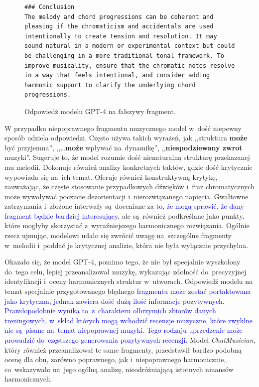 \documentclass[data-science]{agh-wi} %
\begin{document}
\begin{figure}[ht!]
\begin{verbatim}
### Conclusion
The melody and chord progressions can be coherent and pleasing if the chromaticism and accidentals are used intentionally to create tension and resolution. It may sound natural in a modern or experimental context but could be challenging in a more traditional tonal framework. To improve musicality, ensure that the chromatic notes resolve in a way that feels intentional, and consider adding harmonic support to clarify the underlying chord progressions.
\end{verbatim}
    \caption{Odpowiedź modelu GPT-4 na fałszywy fragment.}\label{code:gpt4bad}
\end{figure}

W przypadku niepoprawnego fragmentu muzycznego model w~dość niepewny sposób udziela odpowiedzi. Często używa takich wyrażeń, jak ,,struktura \textbf{może} być przyjemna'', ,,\dots \textbf{może} wpływać na~dynamikę'', ,,\textbf{niespodziewany zwrot} muzyki''. Sugeruje to, że model rozumie dość nienaturalną strukturę przekazanej mu melodii. Dokonuje również analizy konkretnych taktów, gdzie dość krytycznie wypowiada się na~ich temat. Oferuje również konstruktywną krytykę, zauważając, że częste stosowanie przypadkowych dźwięków i~fraz chromatycznych może wywoływać poczucie dezorientacji i~nierozwiązanego napięcia. Gwałtowne zatrzymania i~złożone interwały są~doceniane za \textcolor{blue}{to, że mogą sprawić, że dany fragment będzie bardziej interesujący}, ale są~również podkreślane jako punkty, które mogłyby skorzystać z~wyraźniejszego harmonicznego rozwiązania. Ogólnie rzecz ujmując, modelowi udało się zwrócić uwagę na~szczególne fragmenty w~melodii i~poddać je krytycznej analizie, która nie była wyłącznie przychylna.

Okazało się, że model GPT-4, pomimo tego, że nie był specjalnie wyszkolony do~tego celu, lepiej przeanalizował muzykę, wykazując zdolność do~precyzyjnej identyfikacji i~oceny harmonicznych struktur w~utworach. Odpowiedź modelu na temat specjalnie przygotowanego błędnego \textcolor{blue}{fragmentu może zostać portaktowana jako krytyczna, jednak zawiera dość dużą ilość informacje pozytywnych. Prawdopodobnie wynika to~z~charakteru olbrzymich zbiorów danych treningowych, w~skład których mogą wchodzić recenzje muzyczne, które zwyklne nie są~pisane na~temat niepoprawnej muzyki. Tego rodzaju uprzedzenie może prowadzić do~częstszego generowania pozytywnych recenzji.} Model \textit{ChatMusician}, który również przeanalizował te same fragmenty, przedstawił bardzo podobną ocenę dla obu, zarówno poprawnego, jak i~niepoprawnego harmonicznie, co~wskazywało na~jego ogólną analizę, nieodróżniającą istotnych niuansów harmonicznych.
\end{document}
